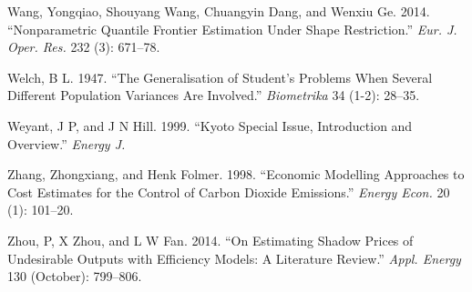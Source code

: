 \documentclass[
  10pt,
]{article}
\begin{document}
\leavevmode\hypertarget{ref-Wang2014}{}%
Wang, Yongqiao, Shouyang Wang, Chuangyin Dang, and Wenxiu Ge. 2014.
``Nonparametric Quantile Frontier Estimation Under Shape Restriction.''
\emph{Eur. J. Oper. Res.} 232 (3): 671--78.

\leavevmode\hypertarget{ref-Welch1947}{}%
Welch, B L. 1947. ``The Generalisation of Student's Problems When
Several Different Population Variances Are Involved.'' \emph{Biometrika}
34 (1-2): 28--35.

\leavevmode\hypertarget{ref-Weyant1999}{}%
Weyant, J P, and J N Hill. 1999. ``Kyoto Special Issue, Introduction and
Overview.'' \emph{Energy J.}

\leavevmode\hypertarget{ref-Zhang1998}{}%
Zhang, Zhongxiang, and Henk Folmer. 1998. ``Economic Modelling
Approaches to Cost Estimates for the Control of Carbon Dioxide
Emissions.'' \emph{Energy Econ.} 20 (1): 101--20.

\leavevmode\hypertarget{ref-Zhou2014}{}%
Zhou, P, X Zhou, and L W Fan. 2014. ``On Estimating Shadow Prices of
Undesirable Outputs with Efficiency Models: A Literature Review.''
\emph{Appl. Energy} 130 (October): 799--806.
\end{document}
